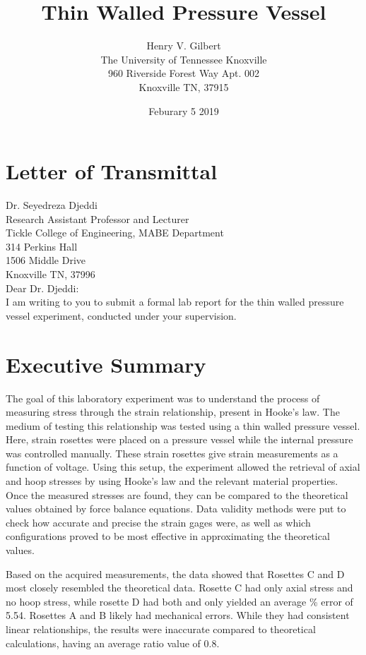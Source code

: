 \documentclass{article}
\title{Thin Walled Pressure Vessel}
\author{Henry V. Gilbert \\
	The University of Tennessee Knoxville \\
	960 Riverside Forest Way
	Apt. 002 \\
	Knoxville TN, 37915
	}
\date {Feburary 5 2019}
\begin{document}
\maketitle
\newpage

\section*{Letter of Transmittal}
Dr. Seyedreza Djeddi \\
Research Assistant Professor and Lecturer \\
Tickle College of Engineering, MABE Department \\
314 Perkins Hall \\
1506 Middle Drive \\
Knoxville TN, 37996 \\

Dear Dr. Djeddi: \\
I am writing to you to submit a formal lab report for the thin walled pressure vessel experiment, 
conducted under your supervision. 

\newpage
\tableofcontents
\newpage
\listoffigures
\newpage
\listoftables
\newpage


\section{Executive Summary}
The goal of this laboratory experiment was to understand the process of measuring stress through the
strain relationship, present in Hooke's law. The medium of testing this relationship was tested using a
thin walled pressure vessel. Here, strain rosettes were placed on a pressure vessel while the internal
pressure was controlled manually. These strain rosettes give strain measurements as a function of
voltage. Using this setup, the experiment allowed the retrieval of axial and hoop stresses by using
Hooke's law and the relevant material properties. Once the measured stresses are found, they
can be compared to the theoretical values obtained by force balance equations. Data validity methods
were put to check how accurate and precise the strain gages were, as well as which configurations 
proved to be most effective in approximating the theoretical values. 

Based on the acquired measurements, the data showed that Rosettes C and D most closely
resembled the theoretical data. Rosette C had only axial stress and no hoop stress, while rosette D had
both and only yielded an average \% error of 5.54. Rosettes A and B likely had mechanical errors. While they 
had consistent linear relationships, the results were inaccurate compared to theoretical calculations, having
an average ratio value of 0.8.
\end{document}
